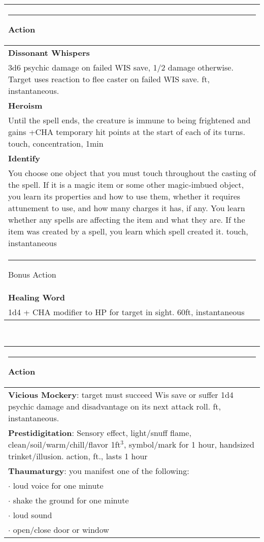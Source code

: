 \documentclass[twocolumn]{article}
\begin{document}
\\
\noindent\begin{tabular}{|m{3.1in}|}
\hline
\rule{1.25in}{0pt}Action\\
\hline
\textbf{Dissonant Whispers}\\
3d6 psychic damage on failed WIS save, 1/2 damage otherwise. Target uses reaction to flee caster on failed WIS save.  {\sc 60 ft, instantaneous}.\\
\textbf{Heroism}\\
Until the spell ends, the creature is immune to being frightened and gains +CHA temporary hit points at the start of each of its turns. {\sc touch, concentration, 1min}\\
\textbf{Identify}\\
You choose one object that you must touch throughout the casting of the spell. If it is a magic item or some other magic-imbued object, you learn its properties and how to use them, whether it requires attunement to use, and how many charges it has, if any. You learn whether any spells are affecting the item and what they are. If the item was created by a spell, you learn which spell created it. {\sc touch, instantaneous}\\
\hline
\rule{1.1in}{0pt}Bonus Action\\
\hline
\textbf{Healing Word}\\
1d4  + CHA modifier to HP for target in sight. {\sc 60ft, instantaneous}\\
\hline
\end{tabular}
\vspace{8pt}

\\
\noindent\begin{tabular}{|m{3.1in}|}
\hline
\rule{1.25in}{0pt}Action\\
\hline
\textbf{Vicious Mockery}: target must succeed Wis save or suffer 1d4 psychic damage and disadvantage on its next attack roll. {\sc 60 ft, instantaneous.}\\
\hline
\textbf{Prestidigitation}: Sensory effect, light/snuff flame, clean/soil/warm/chill/flavor 1ft$^3$, symbol/mark for 1 hour, handsized trinket/illusion.  {\sc action, \sc 10 ft., lasts 1 hour}\\
\hline
\textbf{Thaumaturgy}: you manifest one of the following: \\
$\cdot$ loud voice for one minute \\
$\cdot$ shake the ground for one minute \\
$\cdot$ loud sound \\
$\cdot$ open/close door or window \\
\hline
\end{tabular}
\vspace{8pt}
\end{document}
